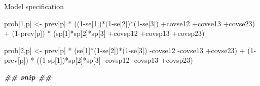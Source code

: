 \documentclass[
  ignorenonframetext,
  aspectratio=169,
]{beamer}
\newenvironment{Shaded}{\begin{snugshade}}{\end{snugshade}}
\newcommand{\DecValTok}[1]{\textcolor[rgb]{0.00,0.00,0.81}{#1}}
\newcommand{\DocumentationTok}[1]{\textcolor[rgb]{0.56,0.35,0.01}{\textbf{\textit{#1}}}}
\newcommand{\NormalTok}[1]{#1}
\newcommand{\OtherTok}[1]{\textcolor[rgb]{0.56,0.35,0.01}{#1}}
\newcommand{\SpecialCharTok}[1]{\textcolor[rgb]{0.00,0.00,0.00}{#1}}
\begin{document}
\begin{frame}[fragile]{Model specification}
\protect\hypertarget{model-specification-1}{}
\scriptsize

\begin{Shaded}
\begin{Highlighting}[]
\NormalTok{prob[}\DecValTok{1}\NormalTok{,p] }\OtherTok{\textless{}{-}}\NormalTok{  prev[p] }\SpecialCharTok{*}\NormalTok{ ((}\DecValTok{1}\SpecialCharTok{{-}}\NormalTok{se[}\DecValTok{1}\NormalTok{])}\SpecialCharTok{*}\NormalTok{(}\DecValTok{1}\SpecialCharTok{{-}}\NormalTok{se[}\DecValTok{2}\NormalTok{])}\SpecialCharTok{*}\NormalTok{(}\DecValTok{1}\SpecialCharTok{{-}}\NormalTok{se[}\DecValTok{3}\NormalTok{]) }
                         \SpecialCharTok{+}\NormalTok{covse12 }\SpecialCharTok{+}\NormalTok{covse13 }\SpecialCharTok{+}\NormalTok{covse23) }\SpecialCharTok{+}
\NormalTok{              (}\DecValTok{1}\SpecialCharTok{{-}}\NormalTok{prev[p]) }\SpecialCharTok{*}\NormalTok{ (sp[}\DecValTok{1}\NormalTok{]}\SpecialCharTok{*}\NormalTok{sp[}\DecValTok{2}\NormalTok{]}\SpecialCharTok{*}\NormalTok{sp[}\DecValTok{3}\NormalTok{] }
                             \SpecialCharTok{+}\NormalTok{covsp12 }\SpecialCharTok{+}\NormalTok{covsp13 }\SpecialCharTok{+}\NormalTok{covsp23)}

\NormalTok{prob[}\DecValTok{2}\NormalTok{,p] }\OtherTok{\textless{}{-}}\NormalTok{ prev[p] }\SpecialCharTok{*}\NormalTok{ (se[}\DecValTok{1}\NormalTok{]}\SpecialCharTok{*}\NormalTok{(}\DecValTok{1}\SpecialCharTok{{-}}\NormalTok{se[}\DecValTok{2}\NormalTok{])}\SpecialCharTok{*}\NormalTok{(}\DecValTok{1}\SpecialCharTok{{-}}\NormalTok{se[}\DecValTok{3}\NormalTok{]) }
                           \SpecialCharTok{{-}}\NormalTok{covse12 }\SpecialCharTok{{-}}\NormalTok{covse13 }\SpecialCharTok{+}\NormalTok{covse23) }\SpecialCharTok{+}
\NormalTok{               (}\DecValTok{1}\SpecialCharTok{{-}}\NormalTok{prev[p]) }\SpecialCharTok{*}\NormalTok{ ((}\DecValTok{1}\SpecialCharTok{{-}}\NormalTok{sp[}\DecValTok{1}\NormalTok{])}\SpecialCharTok{*}\NormalTok{sp[}\DecValTok{2}\NormalTok{]}\SpecialCharTok{*}\NormalTok{sp[}\DecValTok{3}\NormalTok{] }
                              \SpecialCharTok{{-}}\NormalTok{covsp12 }\SpecialCharTok{{-}}\NormalTok{covsp13 }\SpecialCharTok{+}\NormalTok{covsp23)}

\DocumentationTok{\#\# snip \#\#}
        

\end{Highlighting}
\end{Shaded}
\end{frame}
\end{document}
